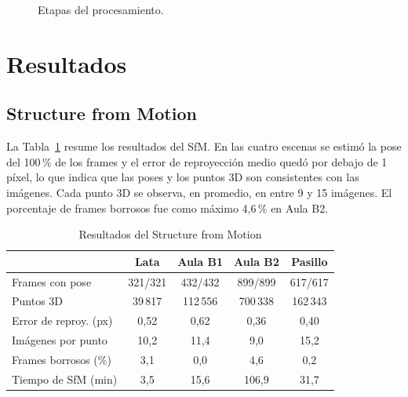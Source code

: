 \documentclass[conference,a4paper]{IEEEtran}
\begin{document}
\begin{figure}[htbp]
\centering
{}
\caption{Etapas del procesamiento.}
\label{fig:pipeline}
\end{figure}

\section{Resultados}



\subsection{Structure from Motion}

La Tabla~\ref{tab:sfm} resume los resultados del SfM. En las cuatro escenas se estimó la pose del 100\,\% de los frames y el error de reproyección medio quedó por debajo de 1 píxel, lo que indica que las poses y los puntos 3D son consistentes con las imágenes. Cada punto 3D se observa, en promedio, en entre 9 y 15 imágenes. El porcentaje de frames borrosos fue como máximo 4,6\,\% en Aula B2.

\begin{table}[htbp]
\caption{Resultados del Structure from Motion}
\label{tab:sfm}
\centering
\setlength{\tabcolsep}{4pt}
\begin{tabular}{@{}lcccc@{}}
\toprule
 & Lata & Aula B1 & Aula B2 & Pasillo \\
\midrule
Frames con pose           & 321/321 & 432/432 & 899/899 & 617/617 \\
Puntos 3D                 & 39\,817 & 112\,556 & 700\,338 & 162\,343 \\
Error de reproy. (px)     & 0,52 & 0,62 & 0,36 & 0,40 \\
Imágenes por punto        & 10,2 & 11,4 & 9,0 & 15,2 \\
Frames borrosos (\%)      & 3,1 & 0,0 & 4,6 & 0,2 \\
Tiempo de SfM (min)       & 3,5 & 15,6 & 106,9 & 31,7 \\
\bottomrule
\end{tabular}
\end{table}
\end{document}
